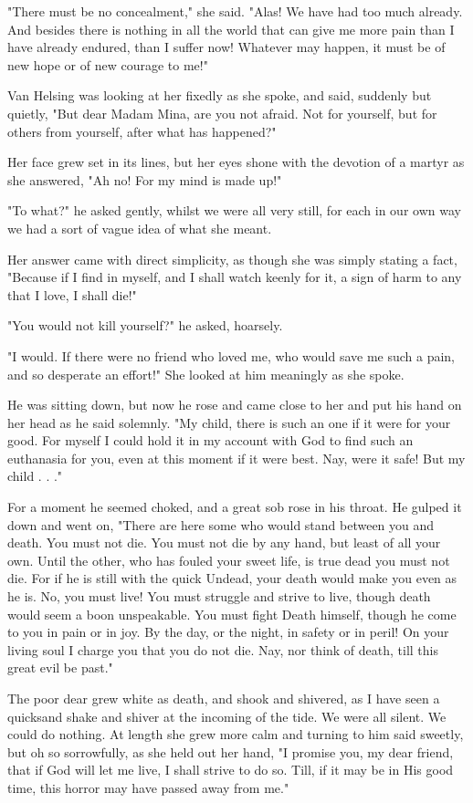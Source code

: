 "There must be no concealment," she said. "Alas! We have had too much already. And besides there is nothing in all the world that can give me more pain than I have already endured, than I suffer now! Whatever may happen, it must be of new hope or of new courage to me!" 

Van Helsing was looking at her fixedly as she spoke, and said, suddenly but quietly, "But dear Madam Mina, are you not afraid. Not for yourself, but for others from yourself, after what has happened?" 

Her face grew set in its lines, but her eyes shone with the devotion of a martyr as she answered, "Ah no! For my mind is made up!" 

"To what?" he asked gently, whilst we were all very still, for each in our own way we had a sort of vague idea of what she meant. 

Her answer came with direct simplicity, as though she was simply stating a fact, "Because if I find in myself, and I shall watch keenly for it, a sign of harm to any that I love, I shall die!" 

"You would not kill yourself?" he asked, hoarsely. 

"I would. If there were no friend who loved me, who would save me such a pain, and so desperate an effort!" She looked at him meaningly as she spoke. 

He was sitting down, but now he rose and came close to her and put his hand on her head as he said solemnly. "My child, there is such an one if it were for your good. For myself I could hold it in my account with God to find such an euthanasia for you, even at this moment if it were best. Nay, were it safe! But my child . . ." 

For a moment he seemed choked, and a great sob rose in his throat. He gulped it down and went on, "There are here some who would stand between you and death. You must not die. You must not die by any hand, but least of all your own. Until the other, who has fouled your sweet life, is true dead you must not die. For if he is still with the quick Undead, your death would make you even as he is. No, you must live! You must struggle and strive to live, though death would seem a boon unspeakable. You must fight Death himself, though he come to you in pain or in joy. By the day, or the night, in safety or in peril! On your living soul I charge you that you do not die. Nay, nor think of death, till this great evil be past." 

The poor dear grew white as death, and shook and shivered, as I have seen a quicksand shake and shiver at the incoming of the tide. We were all silent. We could do nothing. At length she grew more calm and turning to him said sweetly, but oh so sorrowfully, as she held out her hand, "I promise you, my dear friend, that if God will let me live, I shall strive to do so. Till, if it may be in His good time, this horror may have passed away from me." 

